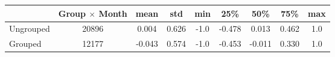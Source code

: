 \begin{tabular}{lcccccccc}
\toprule
{} &  Group $ \times$ Month &   mean &    std &  min &    25\% &    50\% &    75\% &  max \\
\midrule
Ungrouped &                 20896 &  0.004 &  0.626 & -1.0 & -0.478 &  0.013 &  0.462 &  1.0 \\
Grouped   &                 12177 & -0.043 &  0.574 & -1.0 & -0.453 & -0.011 &  0.330 &  1.0 \\
\bottomrule
\end{tabular}
